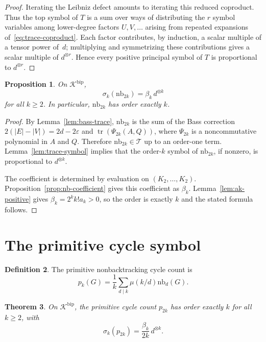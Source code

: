 \documentclass[11pt]{amsart}
\newcommand{\K}{\mathcal{K}}
\newcommand{\cT}{\mathcal{T}}
\newcommand{\tr}{\operatorname{tr}}
\newcommand{\nb}{\mathrm{nb}}
\newtheorem{theorem}{Theorem}[section]
\newtheorem{proposition}[theorem]{Proposition}
\theoremstyle{definition}
\newtheorem{definition}[theorem]{Definition}
\theoremstyle{remark}
\begin{document}
\begin{proof}
Iterating the Leibniz defect amounts to iterating this reduced coproduct. Thus the top symbol of $T$ is a sum over ways of distributing the $r$ symbol variables among lower-degree factors $U,V,\ldots$ arising from repeated expansions of~\eqref{eq:trace-coproduct}. Each factor contributes, by induction, a scalar multiple of a tensor power of~$d$; multiplying and symmetrizing these contributions gives a scalar multiple of $d^{\otimes r}$. Hence every positive principal symbol of $T$ is proportional to $d^{\otimes r}$.
\end{proof}

\begin{proposition}\label{prop:nb-global}
On $\K^{\mathrm{bip}}$,
\[
   \sigma_k(\nb_{2k})=\beta_k\,d^{\otimes k}
\]
for all $k\ge2$. In particular, $\nb_{2k}$ has order exactly $k$.
\end{proposition}

\begin{proof}
By Lemma~\ref{lem:bass-trace}, $\nb_{2k}$ is the sum of the Bass correction $2(|E|-|V|)=2d-2\varepsilon$ and $\tr(\Psi_{2k}(A,Q))$, where $\Psi_{2k}$ is a noncommutative polynomial in $A$ and $Q$. Therefore $\nb_{2k}\in\cT$ up to an order-one term. Lemma~\ref{lem:trace-symbol} implies that the order-$k$ symbol of $\nb_{2k}$, if nonzero, is proportional to $d^{\otimes k}$.

The coefficient is determined by evaluation on $(K_2,\ldots,K_2)$. Proposition~\ref{prop:nb-coefficient} gives this coefficient as $\beta_k$. Lemma~\ref{lem:ak-positive} gives $\beta_k=2^kk!a_k>0$, so the order is exactly $k$ and the stated formula follows.
\end{proof}

\section{The primitive cycle symbol}

\begin{definition}
The primitive nonbacktracking cycle count is
\[
   p_k(G)=\frac{1}{k}\sum_{d\mid k}\mu(k/d)\nb_d(G).
\]
\end{definition}

\begin{theorem}\label{thm:primitive-symbol}
On $\K^{\mathrm{bip}}$, the primitive cycle count $p_{2k}$ has order exactly $k$ for all $k\ge2$, with
\[
   \sigma_k(p_{2k})=\frac{\beta_k}{2k}\,d^{\otimes k}.
\]
\end{theorem}
\end{document}
